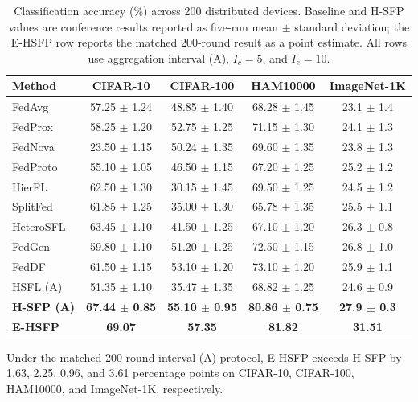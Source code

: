 \begin{table}[t]
\centering
\caption{Classification accuracy (\%) across 200 distributed devices. Baseline and H-SFP values are conference results reported as five-run mean $\pm$ standard deviation; the E-HSFP row reports the matched 200-round result as a point estimate. All rows use aggregation interval (A), $I_c=5$, and $I_e=10$.}
\label{tab:main_classification}
\begin{tabular}{@{}lcccc@{}}
\toprule
Method & CIFAR-10 & CIFAR-100 & HAM10000 & ImageNet-1K \\
\midrule
FedAvg    & 57.25 {\scriptsize $\pm$ 1.24} & 48.85 {\scriptsize $\pm$ 1.40} & 68.28 {\scriptsize $\pm$ 1.45} & 23.1 {\scriptsize $\pm$ 1.4} \\
FedProx   & 58.25 {\scriptsize $\pm$ 1.20} & 52.75 {\scriptsize $\pm$ 1.25} & 71.15 {\scriptsize $\pm$ 1.30} & 24.1 {\scriptsize $\pm$ 1.3} \\
FedNova   & 23.50 {\scriptsize $\pm$ 1.15} & 50.24 {\scriptsize $\pm$ 1.35} & 69.60 {\scriptsize $\pm$ 1.35} & 23.8 {\scriptsize $\pm$ 1.3} \\
FedProto  & 55.10 {\scriptsize $\pm$ 1.05} & 46.50 {\scriptsize $\pm$ 1.15} & 67.20 {\scriptsize $\pm$ 1.25} & 25.2 {\scriptsize $\pm$ 1.2} \\
HierFL    & 62.50 {\scriptsize $\pm$ 1.30} & 30.15 {\scriptsize $\pm$ 1.45} & 69.50 {\scriptsize $\pm$ 1.25} & 24.5 {\scriptsize $\pm$ 1.2} \\
SplitFed  & 61.85 {\scriptsize $\pm$ 1.25} & 35.00 {\scriptsize $\pm$ 1.30} & 65.78 {\scriptsize $\pm$ 1.35} & 25.5 {\scriptsize $\pm$ 1.1} \\
HeteroSFL & 63.45 {\scriptsize $\pm$ 1.10} & 41.50 {\scriptsize $\pm$ 1.25} & 67.10 {\scriptsize $\pm$ 1.20} & 26.3 {\scriptsize $\pm$ 0.8} \\
FedGen    & 59.80 {\scriptsize $\pm$ 1.10} & 51.20 {\scriptsize $\pm$ 1.25} & 72.50 {\scriptsize $\pm$ 1.15} & 26.8 {\scriptsize $\pm$ 1.0} \\
FedDF     & 61.50 {\scriptsize $\pm$ 1.15} & 53.10 {\scriptsize $\pm$ 1.20} & 73.10 {\scriptsize $\pm$ 1.20} & 25.9 {\scriptsize $\pm$ 1.1} \\
HSFL (A)  & 51.35 {\scriptsize $\pm$ 1.10} & 35.47 {\scriptsize $\pm$ 1.35} & 68.82 {\scriptsize $\pm$ 1.25} & 24.6 {\scriptsize $\pm$ 0.9} \\
\textbf{H-SFP (A)} & \textbf{67.44 {\scriptsize $\pm$ 0.85}} & \textbf{55.10 {\scriptsize $\pm$ 0.95}} & \textbf{80.86 {\scriptsize $\pm$ 0.75}} & \textbf{27.9 {\scriptsize $\pm$ 0.3}} \\
\textbf{E-HSFP} & \textbf{69.07} & \textbf{57.35} & \textbf{81.82} & \textbf{31.51} \\
\bottomrule
\end{tabular}
\end{table}
Under the matched 200-round interval-(A) protocol, E-HSFP exceeds H-SFP by 1.63, 2.25, 0.96, and 3.61 percentage points on CIFAR-10, CIFAR-100, HAM10000, and ImageNet-1K, respectively.

